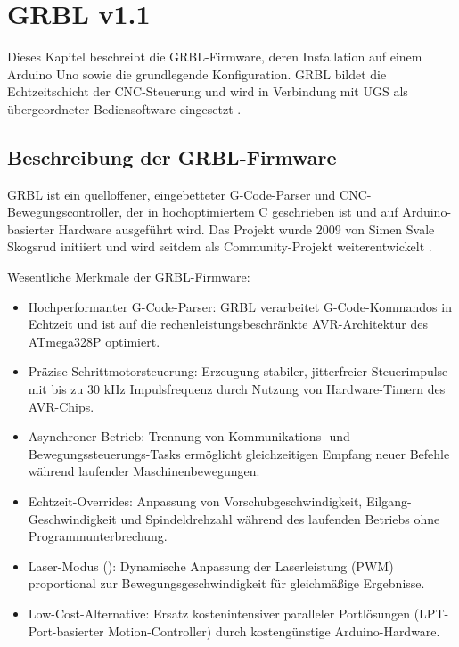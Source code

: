 %
%

\chapter{GRBL v1.1}
\label{cha:grbl}

Dieses Kapitel beschreibt die GRBL-Firmware, deren Installation auf einem Arduino Uno sowie die grundlegende Konfiguration. GRBL bildet die Echtzeitschicht der CNC-Steuerung und wird in Verbindung mit UGS als übergeordneter Bediensoftware eingesetzt \cite{grbl:github}.

\section{Beschreibung der GRBL-Firmware}

GRBL ist ein quelloffener, eingebetteter G-Code-Parser und CNC-Bewegungscontroller, der in hochoptimiertem C geschrieben ist und auf Arduino-basierter Hardware ausgeführt wird. Das Projekt wurde 2009 von Simen Svale Skogsrud initiiert und wird seitdem als Community-Projekt weiterentwickelt \cite{grbl:github}.

Wesentliche Merkmale der GRBL-Firmware:

\begin{itemize}
	\item Hochperformanter G-Code-Parser: GRBL verarbeitet G-Code-Kommandos in Echtzeit und ist auf die rechenleistungsbeschränkte AVR-Architektur des ATmega328P optimiert.
	\item Präzise Schrittmotorsteuerung: Erzeugung stabiler, jitterfreier Steuerimpulse mit bis zu 30 kHz Impulsfrequenz durch Nutzung von Hardware-Timern des AVR-Chips.
	\item Asynchroner Betrieb: Trennung von Kommunikations- und Bewegungssteuerungs-Tasks ermöglicht gleichzeitigen Empfang neuer Befehle während laufender Maschinenbewegungen.
	\item Echtzeit-Overrides: Anpassung von Vorschubgeschwindigkeit, Eilgang-Geschwindigkeit und Spindeldrehzahl während des laufenden Betriebs ohne Programmunterbrechung.
	\item Laser-Modus (): Dynamische Anpassung der Laserleistung (PWM) proportional zur Bewegungsgeschwindigkeit für gleichmäßige Ergebnisse.
	\item Low-Cost-Alternative: Ersatz kostenintensiver paralleler Portlösungen (LPT-Port-basierter Motion-Controller) durch kostengünstige Arduino-Hardware.
\end{itemize}

